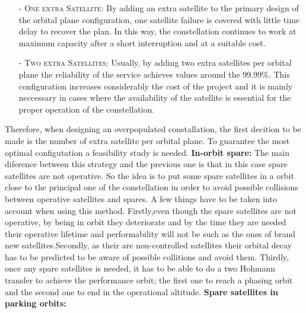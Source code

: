 \begin{itemize}
\item[-] \textsc{One extra Satellite:}
\newline
By adding an extra satellite to the primary design of the orbital plane configuration, one satellite failure is covered with little time delay to recover the plan. In this way, the constellation continues to work at maximum capacity after a short interruption and at a suitable cost. 
\item[-] \textsc{Two extra Satellites:}
\newline
Usually, by adding two extra satellites per orbital plane the reliability of the service achieves values around the 99.99\%. This configuration increases considerably the cost of the project and it is mainly neccessary in cases where the availability of the satellite is essential for the proper operation of the constellation.
\end{itemize}
Therefore, when designing an overpopulated constallation, the first decition to be made is the number of extra satellite per orbital plane. To guarantee the most optimal configutation a feasibility study is needed.  
\newline
\newline
\textbf{In-orbit spare:}
\newline
The main diference between this strategy and the previous one is that in this case spare satellites are not operative. So the idea is to put some spare satellites in a orbit close to the principal one of the constellation in order to avoid possible collisions between operative satellites and spares. 
\newline
\newline
A few things have to be taken into account when using this method. Firstly,even though the spare satellites are not operative, by being in orbit they deteriorate and by the time they are needed their operative lifetime and performability will not be such as the ones of brand new satellites.Secondly, as their are non-controlled satellites their orbital decay has to be predicted to be aware of possible collitions and avoid them. Thirdly, once any spare satellites is needed, it has to be able to do a two Hohmann transfer to achieve the performance orbit; the first one to reach a phasing orbit and the second one to end in the operational altitude.
\newline
\newline
\textbf{Spare satellites in parking orbits:}
\newline
